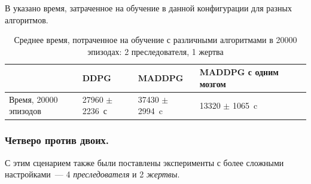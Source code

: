 В  указано время, затраченное на обучение в данной конфигурации для разных алгоритмов.

\begin{table}[t!]
    \centering\small
    \caption{Среднее время, потраченное на обучение с различными алгоритмами в 20000 эпизодах: 2 преследователя, 1 жертва}
    \label{tab-st-time}
    \begin{tabular}{|l|l|l|l|l|l|}
        \hline
        & DDPG               & MADDPG             & MADDPG с одним мозгом \\
        \hline
        Время, 20000 эпизодов & 27960 $\pm$ 2236~с & 37430 $\pm$ 2994~c & 13320 $\pm$ 1065~c    \\ \hline
    \end{tabular}
    \normalsize%
\end{table}

\subsubsection{Четверо против двоих.}

С этим сценарием также были поставлены эксперименты с более сложными настройками~--- 4 \textit{преследователя} и 2 \textit{жертвы}.

